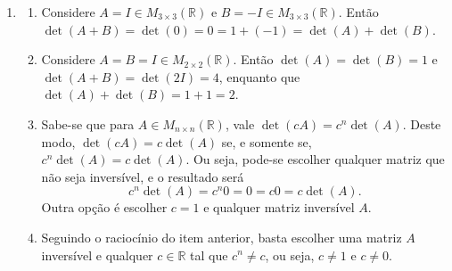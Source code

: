 \documentclass[12pt,a4paper]{article}
\newcommand*\R{\mathbb{R}}
\begin{document}
\begin{enumerate}
\item \begin{enumerate}
\item Considere $A = I \in M_{3 \times 3}(\R)$ e $B = -I \in M_{3 \times 3}(\R)$. Então $\det(A+B) = \det(0) = 0 = 1 + (-1) = \det(A) + \det(B)$.
\item Considere $A = B = I \in M_{2 \times 2}(\R)$. Então $\det(A) = \det(B) = 1$ e $\det(A+B) = \det(2I) = 4$, enquanto que $\det(A) + \det(B) = 1 + 1 = 2$.
\item Sabe-se que para $A \in M_{n \times n}(\R)$, vale $\det(cA) = c^n\det(A)$. Deste modo, $\det(cA) = c \det(A)$ se, e somente se, $c^n\det(A) = c\det(A)$. Ou seja, pode-se escolher qualquer matriz que não seja inversível, e o resultado será \[c^n\det(A) = c^n 0 = 0 = c 0 = c\det(A).\] Outra opção é escolher $c = 1$ e qualquer matriz inversível $A$.
\item Seguindo o raciocínio do item anterior, basta escolher uma matriz $A$ inversível e qualquer $c \in \R$ tal que $c^n \neq c$, ou seja, $c \neq 1$ e $c \neq 0$.
\end{enumerate}


\end{enumerate}
\end{document}
